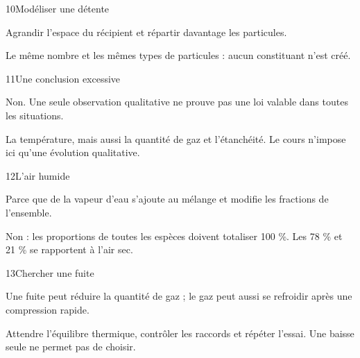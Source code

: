 \par\noindent\begin{minipage}{\linewidth}
\begin{corrige}{10}{Modéliser une détente}
\begin{questions}
\item Agrandir l’espace du récipient et répartir davantage les particules.
\item Le même nombre et les mêmes types de particules : aucun constituant n’est créé.
\end{questions}
\end{corrige}
\end{minipage}
\par\noindent\begin{minipage}{\linewidth}
\begin{corrige}{11}{Une conclusion excessive}
\begin{questions}
\item Non. Une seule observation qualitative ne prouve pas une loi valable dans toutes les situations.
\item La température, mais aussi la quantité de gaz et l’étanchéité. Le cours n’impose ici qu’une évolution qualitative.
\end{questions}
\end{corrige}
\end{minipage}
\par\noindent\begin{minipage}{\linewidth}
\begin{corrige}{12}{L’air humide}
\begin{questions}
\item Parce que de la vapeur d’eau s’ajoute au mélange et modifie les fractions de l’ensemble.
\item Non : les proportions de toutes les espèces doivent totaliser 100 \%. Les 78 \% et 21 \% se rapportent à l’air sec.
\end{questions}
\end{corrige}
\end{minipage}
\par\noindent\begin{minipage}{\linewidth}
\begin{corrige}{13}{Chercher une fuite}
\begin{questions}
\item Une fuite peut réduire la quantité de gaz ; le gaz peut aussi se refroidir après une compression rapide.
\item Attendre l’équilibre thermique, contrôler les raccords et répéter l’essai. Une baisse seule ne permet pas de choisir.
\end{questions}
\end{corrige}
\end{minipage}
